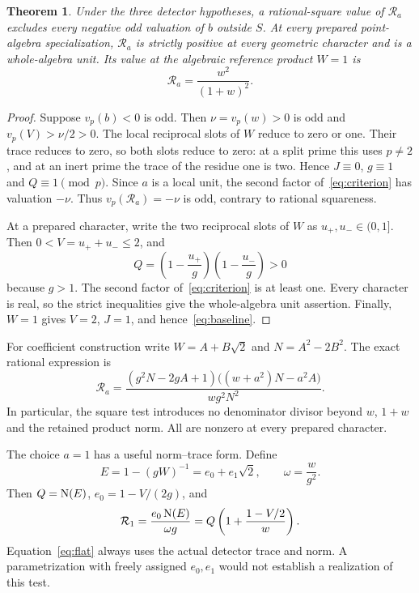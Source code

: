 \documentclass[11pt,a4paper]{article}
\newtheorem{theorem}{Theorem}[section]
\begin{document}
\begin{theorem}\label{thm:criterion}
Under the three detector hypotheses, a rational-square value of
$\mathcal R_a$ excludes every negative odd valuation of $b$ outside
$S$. At every prepared point-algebra specialization,
$\mathcal R_a$ is strictly positive at every geometric character and
is a whole-algebra unit. Its value at the algebraic reference product
$W=1$ is
\begin{equation}\label{eq:baseline}
                  \mathcal R_a=\frac{w^2}{(1+w)^2}.
\end{equation}
\end{theorem}
\begin{proof}
Suppose $v_p(b)<0$ is odd. Then $\nu=v_p(w)>0$ is odd and
$v_p(V)>\nu/2>0$. The local reciprocal slots of $W$ reduce to zero
or one. Their trace reduces to zero, so both slots reduce to zero:
at a split prime this uses $p\ne2$, and at an inert prime the trace
of the residue one is two. Hence $J\equiv0$, $g\equiv1$ and
$Q\equiv1\pmod p$. Since $a$ is a local unit, the second factor
of~\eqref{eq:criterion} has valuation $-\nu$. Thus
$v_p(\mathcal R_a)=-\nu$ is odd, contrary to rational squareness.

At a prepared character, write the two reciprocal slots of $W$ as
$u_+,u_-\in(0,1]$. Then $0<V=u_++u_-\le2$, and
\[
 Q=\left(1-\frac{u_+}{g}\right)
   \left(1-\frac{u_-}{g}\right)>0
\]
because $g>1$. The second factor of~\eqref{eq:criterion} is at
least one. Every character is real, so the strict inequalities give
the whole-algebra unit assertion. Finally, $W=1$ gives $V=2$, $J=1$,
and hence~\eqref{eq:baseline}.
\end{proof}

For coefficient construction write $W=A+B\sqrt2$ and $N=A^2-2B^2$.
The exact rational expression is
\begin{equation}\label{eq:cleared}
 \mathcal R_a=
 \frac{(g^2N-2gA+1)\bigl((w+a^2)N-a^2A\bigr)}
 {wg^2N^2}.
\end{equation}
In particular, the square test introduces no denominator divisor beyond
$w$, $1+w$ and the retained product norm. All are nonzero at every
prepared character.

The choice $a=1$ has a useful norm--trace form. Define
\[
 E=1-(gW)^{-1}=e_0+e_1\sqrt2,\qquad
 \omega=\frac{w}{g^2}.
\]
Then $Q=\operatorname{N}(E)$, $e_0=1-V/(2g)$, and
\begin{equation}\label{eq:flat}
 \mathcal R_1=
 \frac{e_0\operatorname{N}(E)}{\omega g}
 =Q\left(1+\frac{1-V/2}{w}\right).
\end{equation}
Equation~\eqref{eq:flat} always uses the actual detector trace and
norm. A parametrization with freely assigned $e_0,e_1$ would not
establish a realization of this test.
\end{document}
